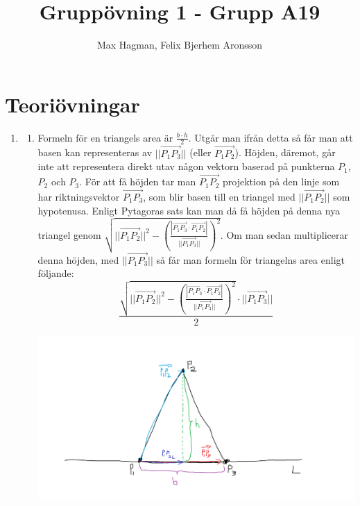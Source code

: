 \documentclass[a4paper]{report}
\title{Gruppövning 1 - Grupp A19}
\author{Max Hagman, Felix Bjerhem Aronsson}
\begin{document}
\maketitle

\chapter{Teoriövningar}
\begin{enumerate}
    \item 
        \begin{enumerate}
            \item 
                Formeln för en triangels area är $\frac{b \cdot h}{2}$.
                Utgår man ifrån detta så får man att basen kan representeras av $||\overrightarrow{P_{1}P_{3}}||$ (eller $\overrightarrow{P_{1}P_{2}}$).
                Höjden, däremot, går inte att representera direkt utav någon vektorn baserad på punkterna $P_{1}$, $P_{2}$ och $P_{3}$.
                För att få höjden tar man $\overrightarrow{P_{1}P_{2}}$ projektion på den linje som har riktningsvektor $\overrightarrow{P_{1}P_{3}}$, 
                som blir basen till en triangel med $||\overrightarrow{P_{1}P_{2}}||$ som hypotenusa.
                Enligt Pytagoras sats kan man då få höjden på denna nya triangel genom $\sqrt{ ||\overrightarrow{P_{1}P_{2}}||^{2} - (\frac{|\overrightarrow{P_{1}P_{3}}\cdot \overrightarrow{P_{1}P_{2}}|}{||\overrightarrow{P_{1}P_{3}}||})^{2}}$.
                Om man sedan multiplicerar denna höjden, med $||\overrightarrow{P_{1}P_{3}}||$ så får man formeln för triangelns area enligt följande:\\
                \begin{equation}
                        \frac{\sqrt{ ||\overrightarrow{P_{1}P_{2}}||^{2} - (\frac{|\overrightarrow{P_{1}P_{3}}\cdot \overrightarrow{P_{1}P_{2}}|}{||\overrightarrow{P_{1}P_{3}}||})^{2}}\cdot ||\overrightarrow{P_{1}P_{3}}||}{2}
                \end{equation}

                \begin{center}
                    \includegraphics[scale=0.15]{bild.png}
                \end{center}


\end{enumerate}
\end{enumerate}
\end{document}
